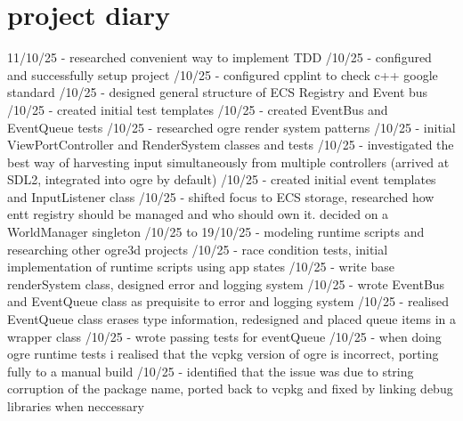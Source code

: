 \documentclass[]{final_report}
\begin{document}
\section{project diary}
11/10/25 - researched convenient way to implement TDD /10/25 - configured and successfully setup project /10/25 - configured cpplint to check c++ google standard /10/25 - designed general structure of ECS Registry and Event bus /10/25 - created initial test templates /10/25 - created EventBus and EventQueue tests /10/25 - researched ogre render system patterns /10/25 - initial ViewPortController and RenderSystem classes and tests /10/25 - investigated the best way of harvesting input simultaneously from multiple controllers (arrived at SDL2, integrated into ogre by default) /10/25 - created initial event templates and InputListener class /10/25 - shifted focus to ECS storage, researched how entt registry should be managed and who should own it. decided on a WorldManager singleton /10/25 to 19/10/25 - modeling runtime scripts and researching other ogre3d projects /10/25 - race condition tests, initial implementation of runtime scripts using app states /10/25 - write base renderSystem class, designed error and logging system /10/25 - wrote EventBus and EventQueue class as prequisite to error and logging system /10/25 - realised EventQueue class erases type information, redesigned and placed queue items in a wrapper class /10/25 - wrote passing tests for eventQueue /10/25 - when doing ogre runtime tests i realised that the vcpkg version of ogre is incorrect, porting fully to a manual build /10/25 - identified that the issue was due to string corruption of the package name, ported back to vcpkg and fixed by linking debug libraries when neccessary \newline
\end{document}
